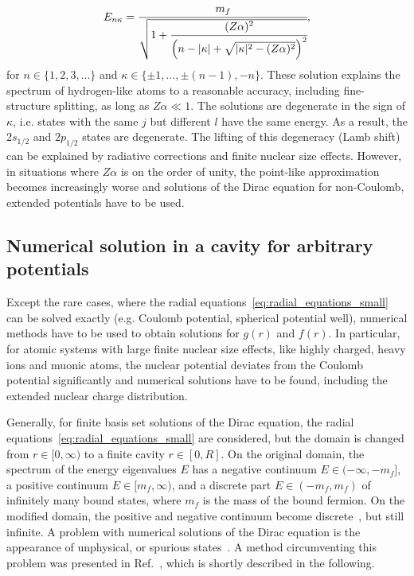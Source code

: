 \begin{equation}
\label{eq:finestructure_formula}
E_{n\kappa}=\cfrac{m_f}{\sqrt{1+\cfrac{(Z\alpha)^2}{\left( n-|\kappa|+\sqrt{|\kappa|^2-(Z\alpha)^2} \right)^2}}},
\end{equation}
for $n\in \{1,2,3,...\}$ and $\kappa \in \{\pm 1,...,\pm(n-1),-n\}$.
These solution explains the spectrum of hydrogen-like atoms to a reasonable accuracy, including fine-structure splitting, as long as $Z\alpha\ll 1$. The solutions are degenerate in the sign of $\kappa$, i.e. states with the same $j$ but different $l$ have the same energy. As a result, the $2s_{1/2}$ and $2p_{1/2}$ states are degenerate. The lifting of this degeneracy (Lamb shift) can be explained by radiative corrections and finite nuclear size effects. However, in situations where $Z\alpha$ is on the order of unity, the point-like approximation becomes increasingly worse and solutions of the Dirac equation for non-Coulomb, extended potentials have to be used.



\subsection{Numerical solution in a cavity for arbitrary potentials}
Except the rare cases, where the radial equations~\eqref{eq:radial_equations_small} can be solved exactly (e.g. Coulomb potential, spherical potential well), numerical methods have to be used to obtain solutions for $g(r)$ and $f(r)$. In particular, for atomic systems with large finite nuclear size effects, like highly charged, heavy ions and muonic atoms, the nuclear potential deviates from the Coulomb potential significantly and numerical solutions have to be found, including the extended nuclear charge distribution.
 
Generally, for finite basis set solutions of the Dirac equation, the radial equations~\eqref{eq:radial_equations_small} are considered, but the domain is changed from $r\in[0,\infty)$ to a finite cavity $r\in [0,R]$. On the original domain, the spectrum of the energy eigenvalues $E$ has a negative continuum $E\in (-\infty,-m_f]$, a positive continuum $E\in [m_f,\infty)$, and a discrete part $E\in (-m_f,m_f)$ of infinitely many bound states, where $m_f$ is the mass of the bound fermion. On the modified domain, the positive and negative continuum become discrete~\cite{johnson1988}, but still infinite.
A problem with numerical solutions of the Dirac equation is the appearance of unphysical, or spurious states~\cite{johnson1988, drake1981}. A method circumventing this problem was presented in Ref.~\cite{Shabaev2004}, which is shortly described in the following.

